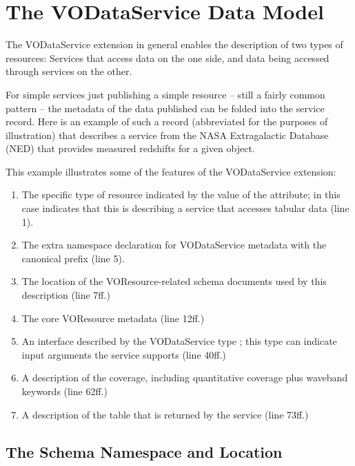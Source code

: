 \documentclass[11pt,a4paper]{ivoa}
\begin{document}
\section{The VODataService Data Model}


The VODataService extension in general enables the description of two
types of resources:  Services that access data on the one side, and data
being accessed through services on the other.  

For simple services just publishing a simple resource -- still a fairly
common pattern -- the metadata of the data published can be folded into
the service record.
Here is an example of such a record (abbreviated for the
purposes of illustration) that describes a service from the NASA
Extragalactic Database (NED) that provides measured redshifts for a
given object.




This example illustrates some of the features of the VODataService
extension:

\begin{enumerate}
\item The specific type of resource indicated by
       the value of the  attribute; in this case
        indicates that this is
       describing a service that accesses tabular data (line 1).
\item The extra namespace declaration for 
       VODataService metadata with the canonical prefix (line 5).
\item The location of the VOResource-related schema 
       documents used by this description (line 7ff.)
\item The core VOResource metadata (line 12ff.)
\item An interface described by the
       VODataService type ; this
       type can indicate input arguments the service supports (line
       40ff.)
\item A description of the
       coverage, including quantitative coverage
       plus waveband keywords (line 62ff.)
\item A description of the table that is returned
       by the service (line 73ff.)
\end{enumerate}

\subsection{The Schema Namespace and Location}
\end{document}
